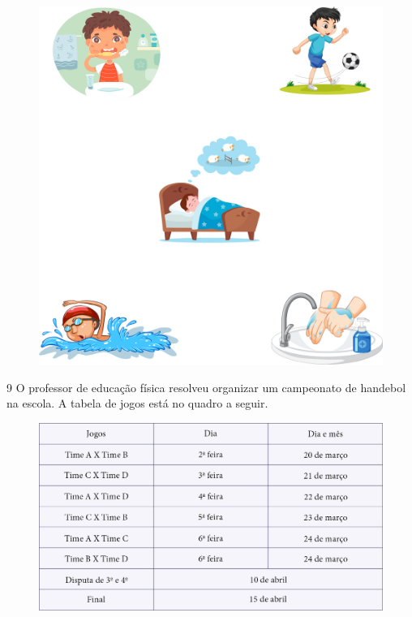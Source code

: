 \begin{figure}[htpb!]
\includegraphics[width=\textwidth]{./media/image57.png}
\end{figure}


\pagebreak
\num{9} O professor de educação física resolveu organizar um campeonato de
handebol na escola. A tabela de jogos está no quadro a seguir.

\begin{figure}[htpb!]
\includegraphics[width=\textwidth]{./media/image58.png}
\end{figure}

